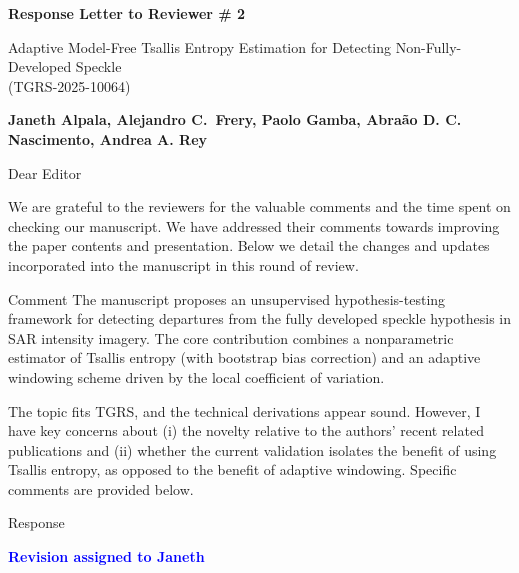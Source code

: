 \documentclass[11pt]{report}
\newcommand{\assigned}[1]{\textcolor{blue}{\textbf{#1}}}
\begin{document}
\begin{center}
\large{\textbf{Response Letter to Reviewer \# 2}}

\vglue 0.3cm

\huge{ Adaptive Model-Free Tsallis Entropy Estimation for Detecting Non-Fully-Developed Speckle\\ (TGRS-2025-10064)}
\end{center}

\begin{center}
\textbf{Janeth Alpala,  Alejandro C.\ Frery, Paolo Gamba, Abraão D. C. Nascimento, Andrea A. Rey }
\end{center}

\date{\today}


\vspace{0.5cm}
\noindent Dear Editor
\bigskip

\noindent We are grateful to the reviewers for the valuable comments and the time spent on checking our manuscript. 
We have addressed their comments towards improving the paper contents and presentation. 
Below we detail the changes and updates incorporated into the manuscript in this round of review.

\medskip



\vspace{0.5cm}

\begin{reviewbox}{Comment}
The manuscript proposes an unsupervised hypothesis-testing framework for detecting departures from the fully developed speckle hypothesis in SAR intensity imagery. The core contribution combines a nonparametric estimator of Tsallis entropy (with bootstrap bias correction) and an adaptive windowing scheme driven by the local coefficient of variation.

The topic fits TGRS, and the technical derivations appear sound. However, I have key concerns about (i) the novelty relative to the authors' recent related publications and (ii) whether the current validation isolates the benefit of using Tsallis entropy, as opposed to the benefit of adaptive windowing. Specific comments are provided below.
\end{reviewbox}

\begin{responsebox}{Response}

\assigned{Revision assigned to Janeth}

\end{responsebox}
\end{document}
